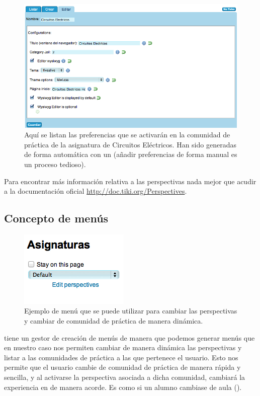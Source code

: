 \begin{figure}
\centering
\includegraphics[width=\linewidth]{../graphics/fig_detalle_modificacion_preferencias.png}
\caption{Aquí se listan las preferencias que se activarán en la comunidad de práctica de la asignatura de Circuitos Eléctricos. Han sido generadas de forma automática con un \profile{} (añadir preferencias de forma manual es un proceso tedioso).}\label{fig:detalle_modificacion_preferencias}
\end{figure}

Para encontrar más información relativa a las perspectivas nada mejor que acudir a la documentación oficial \url{http://doc.tiki.org/Perspectives}.

\subsection{Concepto de menús}

\begin{figure}
\centering
\includegraphics{../graphics/fig_menu_perspectivas.png}
\caption{Ejemplo de menú que se puede utilizar para cambiar las perspectivas y cambiar de comunidad de práctica de manera dinámica.}\label{fig:menu_perspectivas}
\end{figure}

\tiki{} tiene un gestor de creación de menús de manera que podemos generar menús que en nuestro caso nos permiten cambiar de manera dinámica las perspectivas y listar a las comunidades de práctica a las que pertenece el usuario. Esto nos permite que el usuario cambie de comunidad de práctica de manera rápida y sencilla, y al activarse la perspectiva asociada a dicha comunidad, cambiará la experiencia en \tiki{} de manera acorde. Es como si un alumno cambiase de aula ().

